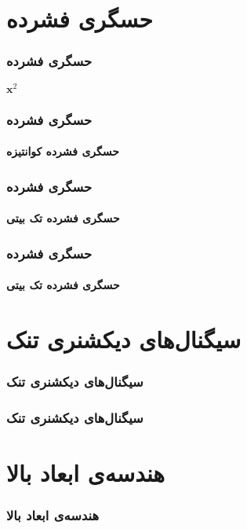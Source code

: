 \begin{frame}
\tableofcontents
\end{frame}


\section{حسگری فشرده\hfill}

\begin{frame}
\frametitle{حسگری فشرده}
$\bm{x}^{2}$
\end{frame}

\begin{frame}
\frametitle{حسگری فشرده}
\framesubtitle{حسگری فشرده کوانتیزه}
\end{frame}

\begin{frame}
\frametitle{حسگری فشرده}
\framesubtitle{حسگری فشرده تک بیتی}
\end{frame}

\begin{frame}
\frametitle{حسگری فشرده}
\framesubtitle{حسگری فشرده تک بیتی}
\end{frame}


\section{سیگنال‌های دیکشنری تنک\hfill}

\begin{frame}
\frametitle{سیگنال‌های دیکشنری تنک}

\end{frame}

\begin{frame}
\frametitle{سیگنال‌های دیکشنری تنک}

\end{frame}

\section{هندسه‌ی ابعاد بالا\hfill}

\begin{frame}
\frametitle{هندسه‌ی ابعاد بالا}

\end{frame}

